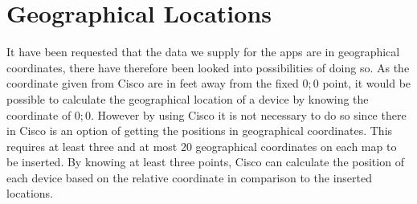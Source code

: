 \section{Geographical Locations}
It have been requested that the data we supply for the apps are in geographical coordinates, there have therefore been looked into possibilities of doing so.
As the coordinate given from Cisco are in feet away from the fixed ${0;0}$ point, it would be possible to calculate the geographical location of a device by knowing the coordinate of ${0;0}$. 
However by using Cisco it is not necessary to do so since there in Cisco is an option of getting the positions in geographical coordinates. This requires at least three and at most 20 geographical coordinates on each map to be inserted. By knowing at least three points, Cisco can calculate the position of each device based on the relative coordinate in comparison to the inserted locations\cite{geo_cisco}.



